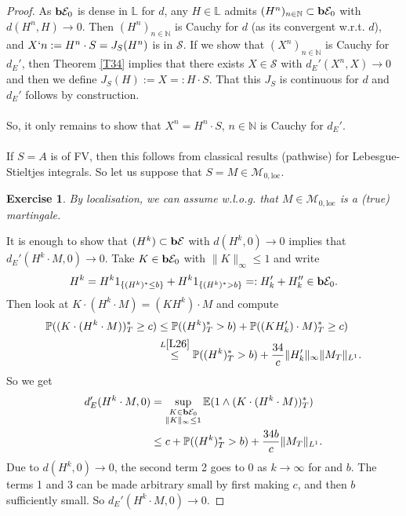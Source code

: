 \documentclass[12pt,a4paper, twoside]{article}
\newtheorem{exe}{Exercise}[section]
\theoremstyle{definition}
\newcommand{\EE}{\mathbb{E}} %
\newcommand{\PP}{\mathbb{P}} %
\newcommand{\simple}{\textbf{\text{b}}\mathcal{E}}
\begin{document}
\newpage
\begin{proof}
As $\simple_0$ is dense in $\mathbb{L}$ for $d$, any $H \in \mathbb{L}$ admits $(H^n)_{n \in \mathbb{N}} \subset \simple_0$ with $d(H^n, H) \to 0$. Then $(H^n)_{n \in \mathbb{N}}$ is Cauchy for $d$ (as its convergent w.r.t. $d$), and $X`n := H^n \cdot S = J_S(H^n)$ is in $\mathcal{S}$. If we show that $(X^n)_{n \in \mathbb{N}}$ is Cauchy for $d_E'$, then Theorem \ref{T34} implies that there exists $X \in \mathcal{S}$ with $d_E'(X^n,X) \to 0$ and then we define $J_S(H):= X=: H \cdot S$. That this $J_S$ is continuous for $d$ and $d_E'$ follows by construction.
\\\\
So,  it only remains to show that $X^n = H^n \cdot S$, $n \in \mathbb{N}$ is Cauchy for $d_E'$. 
\\\\
If $S=A$ is of FV, then this follows from classical results (pathwise) for Lebesgue-Stieltjes integrals. So let us suppose that $S=M \in \mathcal{M}_{0, \text{loc}}$. 
\begin{exe} By localisation, we can assume w.l.o.g. that $M \in \mathcal{M}_{0, \text{loc}}$ is a (true) martingale. 
\end{exe}
It is enough to show that $(H^k) \subset \simple$ with $d(H^k,0) \to 0$ implies that \\ $d_E'( H^k \cdot M, 0) \to 0$. Take $K \in \simple_0$ with $\|K\|_\infty \leq 1$ and write 
\begin{align*}
H^k = H^k 1_{\{ (H^k)^* \leq b \}} + H^k1_{\{ (H^k)^* > b\}} =: H_k' + H_k'' \in \simple_0.
\end{align*}
Then look at $K \cdot (H^k \cdot M) = (KH^k) \cdot M$ and compute
\begin{align*}
\PP((K \cdot (H^k \cdot M))_T^* \geq c) &\leq \PP((H^k)_T^* > b) + \PP((KH_k') \cdot M)_T^* \geq c) \\
& \overset{L \ref{L26}}\leq \PP((H^k)_T^* > b) + \frac{34}{c} \|H_k'\|_\infty \|M_T\|_{L^1}.
\end{align*}
So we get
\begin{align*}
d_E' ( H^k \cdot M, 0 ) &= \sup_{\substack{ K \in \simple_0 \\ \|K\|_\infty \leq 1}} \EE(1 \wedge (K \cdot (H^k \cdot M))_T^*) \\
& \leq c + \PP((H^k)_T^* > b) + \frac{34b}{c}\|M_T\|_{L^1}.
\end{align*}
Due to $d(H^k, 0) \to 0$, the second term 2 goes to $0$ as $k \to \infty$ for and $b$. The terms 1 and 3 can be made arbitrary small by first making $c$, and then $b$ sufficiently small. So $d_E'(H^k \cdot M, 0) \to 0$. 
\end{proof}
\end{document}
